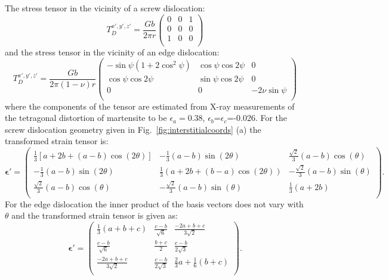 The stress tensor in the vicinity of a screw dislocation:
%
\begin{equation}
T^{x',y',z'}_{D}=
\frac{Gb}{2\pi r}
\left(
\begin{array}{ccc}
0 & 0 & 1 \\
0 & 0 & 0 \\
1 & 0 & 0 \\
\end{array}
\right)
\end{equation}
%
and the stress tensor in the vicinity of an edge dislocation:
\begin{equation}
T^{x',y',z'}_{D}=
\frac{Gb}{2\pi(1-\nu)r}
\left(
\begin{array}{ccc}
-\sin\psi(1+2 \cos^{2}\psi) & \cos\psi\cos 2\psi & 0 \\
\cos\psi\cos 2\psi & \sin\psi\cos 2\psi & 0 \\
0 & 0 & -2\nu\sin\psi \\
\end{array}
\right)
\end{equation}
%
where the components of the tensor are estimated from X-ray measurements
of the tetragonal distortion of martensite to be $\epsilon_{a}=0.38$,
$\epsilon_{b}$=$\epsilon_{c}$=-0.026. For the screw dislocation
geometry given in Fig.~\ref{fig:interstitialcoords} (a) the transformed strain
tensor is:
%
%
\begin{equation}
\mathbf{\epsilon}'=\left(
\begin{array}{ccc}
 \frac{1}{3}[a+2 b+(a-b) \cos (2 \theta)] & -\frac{1}{3} (a-b) \sin (2 \theta ) & \frac{\sqrt{2}}{3} (a-b)\cos(\theta )\\
 -\frac{1}{3} (a-b) \sin (2 \theta ) & \frac{1}{3} (a+2 b+(b-a) \cos (2 \theta )) & -\frac{\sqrt{2}}{3}(a-b) \sin (\theta )\\
 \frac{\sqrt{2}}{3} (a-b) \cos (\theta ) & -\frac{\sqrt{2}}{3}(a-b)\sin(\theta ) & \frac{1}{3}(a+2 b)\\
\end{array}
\right).
\end{equation}
%
For the edge dislocation the inner product of the basis vectors does not vary with $\theta$
and the transformed strain tensor is given as:
%
\begin{equation}
\mathbf{\epsilon}'=\left(
\begin{array}{ccc}
 \frac{1}{3} (a+b+c) & \frac{c-b}{\sqrt{6}} & \frac{-2 a+b+c}{3 \sqrt{2}} \\
 \frac{c-b}{\sqrt{6}} & \frac{b+c}{2} & \frac{c-b}{2 \sqrt{3}} \\
 \frac{-2 a+b+c}{3 \sqrt{2}} & \frac{c-b}{2 \sqrt{3}} & \frac{2}{3}a + \frac{1}{6}(b+c) \\
\end{array}
\right).
\end{equation}

